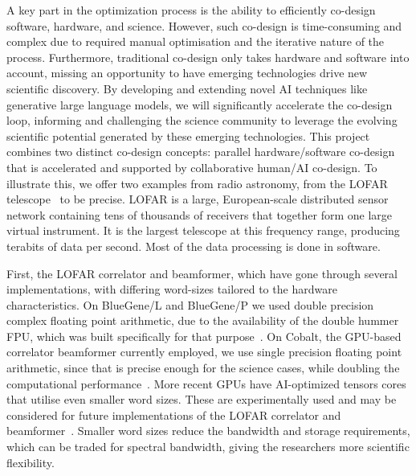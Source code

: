 \documentclass[a4wide,twocolumn]{article}
\begin{document}
A key part in the optimization process is the ability to efficiently co-design software, hardware, and science.
However, such co-design is time-consuming and complex due to required manual optimisation and the iterative nature of the process. Furthermore, traditional co-design only takes hardware and software into account, missing an opportunity to have emerging technologies drive new scientific discovery. 
By developing and extending novel AI techniques like generative large language models, we will significantly accelerate the co-design loop, informing and challenging the science community to leverage the evolving scientific potential generated by these emerging technologies. 
This project combines two distinct co-design concepts: parallel hardware/software co-design that is accelerated and supported by collaborative human/AI co-design. 
To illustrate this, we offer two examples from radio astronomy, from the LOFAR telescope~\cite{van2013lofar} to be precise. LOFAR is a large, European-scale distributed sensor network containing tens of thousands of receivers that together form one large virtual instrument. It is the largest telescope at this frequency range, producing terabits of data per second. Most of the data processing is done in software.

First, the LOFAR correlator and beamformer, which have gone through several implementations, with differing word-sizes tailored to the hardware characteristics. On BlueGene/L and BlueGene/P we used double precision complex floating point arithmetic, due to the availability of the double hummer FPU, which was built specifically for that purpose~\cite{romein_astronomical_2006,Romein:11a,romein_lofar_2010}. On Cobalt, the GPU-based correlator beamformer currently employed, we use single precision floating point arithmetic, since that is precise enough for the science cases, while doubling the computational performance~\cite{broekema_cobalt_2018,varbanescu2009building,sclocco2012radio,van2010building}. 
More recent GPUs have AI-optimized tensors cores that utilise even smaller word sizes. 
These are experimentally used and may be considered for future implementations of the LOFAR correlator and beamformer~\cite{romein_tensor-core_2021}. 
Smaller word sizes reduce the bandwidth and storage requirements, which can be traded for spectral bandwidth, giving the researchers more scientific flexibility.
\end{document}
